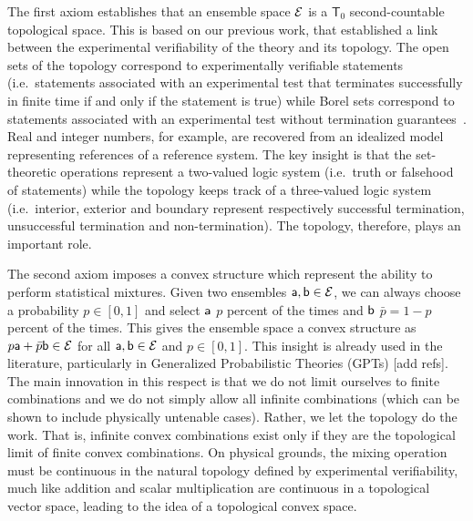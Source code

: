 The first axiom establishes that an ensemble space $\Ens$ is a $\mathsf{T}_0$ second-countable topological space. This is based on our previous work, that established a link between the experimental verifiability of the theory and its topology. The open sets of the topology correspond to experimentally verifiable statements (i.e.~statements associated with an experimental test that terminates successfully in finite time if and only if the statement is true) while Borel sets correspond to statements associated with an experimental test without termination guarantees~\cite{aop-book,aop-topExpDisting}. Real and integer numbers, for example, are recovered from an idealized model representing references of a reference system. The key insight is that the set-theoretic operations represent a two-valued logic system (i.e.~truth or falsehood of statements) while the topology keeps track of a three-valued logic system (i.e.~interior, exterior and boundary represent respectively successful termination, unsuccessful termination and non-termination). The topology, therefore, plays an important role.

The second axiom imposes a convex structure which represent the ability to perform statistical mixtures. Given two ensembles $\ens[a], \ens[b] \in \Ens$, we can always choose a probability $p \in [0,1]$ and select $\ens[a]$ $p$ percent of the times and $\ens[b]$ $\bar{p} = 1-p$ percent of the times. This gives the ensemble space a convex structure as $p \ens[a] + \bar{p} \ens[b] \in \Ens$ for all $\ens[a], \ens[b] \in \Ens$ and $p \in [0,1]$. This insight is already used in the literature, particularly in Generalized Probabilistic Theories (GPTs) [add refs]. The main innovation in this respect is that we do not limit ourselves to finite combinations and we do not simply allow all infinite combinations (which can be shown to include physically untenable cases). Rather, we let the topology do the work. That is, infinite convex combinations exist only if they are the topological limit of finite convex combinations. On physical grounds, the mixing operation must be continuous in the natural topology defined by experimental verifiability, much like addition and scalar multiplication are continuous in a topological vector space, leading to the idea of a topological convex space.

